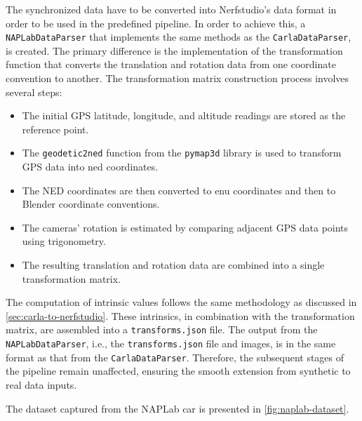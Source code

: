 The synchronized data have to be converted into Nerfstudio's data format in order to be used in the predefined pipeline. In order to achieve this, a \texttt{NAPLabDataParser} that implements the same methods as the \texttt{CarlaDataParser}, is created. The primary difference is the implementation of the transformation function that converts the translation and rotation data from one coordinate convention to another. The transformation matrix construction process involves several steps:

\begin{itemize}
    \item The initial GPS latitude, longitude, and altitude readings are stored as the reference point.
    \item The \texttt{geodetic2ned} function from the \texttt{pymap3d} library \cite{Hirsch_PyGemini} is used to transform GPS data into \acrfull{ned} coordinates.
    \item The NED coordinates are then converted to \acrfull{enu} coordinates and then to Blender coordinate conventions.
    \item The cameras' rotation is estimated by comparing adjacent GPS data points using trigonometry.
    \item The resulting translation and rotation data are combined into a single transformation matrix.
\end{itemize}

The computation of intrinsic values follows the same methodology as discussed in \autoref{sec:carla-to-nerfstudio}. These intrinsics, in combination with the transformation matrix, are assembled into a \texttt{transforms.json} file. The output from the \texttt{NAPLabDataParser}, i.e., the \texttt{transforms.json} file and images, is in the same format as that from the \texttt{CarlaDataParser}. Therefore, the subsequent stages of the pipeline remain unaffected, ensuring the smooth extension from synthetic to real data inputs.

The dataset captured from the NAPLab car is presented in \autoref{fig:naplab-dataset}.







